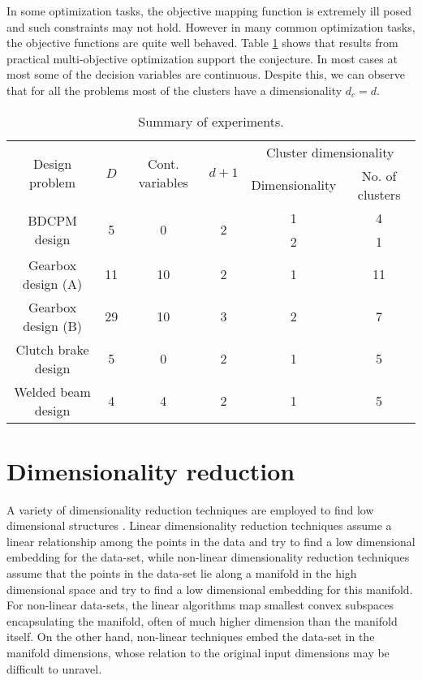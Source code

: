 In some optimization tasks, the objective mapping function is extremely ill
posed and such constraints may not hold. However in many common
optimization tasks, the objective functions are quite well behaved. Table
\ref{expSummary} shows that results from practical multi-objective
optimization support the conjecture. In most cases at most some of the 
decision variables are continuous. Despite this, we can observe that for
all the problems most of the clusters have a dimensionality $d_c = d$.

\begin{table}[!ht]
  \centering
  \begin{tabular}{|c|c|c|c|c|c|}
    \hline
    \multirow{2}{*}{Design problem} & \multirow{2}{*}{$D$} & \multirow{2}{*}{Cont. variables} & \multirow{2}{*}{$d+1$}  & \multicolumn{2}{c|}{Cluster dimensionality} \\
    \cline{5-6} 
    &&&&Dimensionality & No. of clusters \\
    \hline
    \multirow{2}{*}{BDCPM design} & \multirow{2}{*}{5} & \multirow{2}{*}{0} & \multirow{2}{*}{2} & 1 & 4 \\
    \cline{5-6} 
    &&&&2 & 1 \\
    \hline
    Gearbox design (A) & 11 &10 & 2 & 1 & 11 \\
    \hline
    Gearbox design (B) & 29 & 10 & 3 & 2 & 7 \\
    \hline
    Clutch brake design & 5 & 0 & 2 & 1 & 5 \\
    \hline
    Welded beam design & 4 & 4 & 2 & 1 & 5 \\

    \hline
  \end{tabular}
  \caption{Summary of experiments.}
  \label{expSummary}
\end{table}


\section{Dimensionality reduction}
A variety of dimensionality reduction techniques are employed to find low
dimensional structures \citep{mph07}. Linear dimensionality reduction
techniques assume a linear relationship among the points in the data and
try to find a low dimensional embedding for the data-set, while non-linear
dimensionality reduction techniques assume that the points in the data-set
lie along a manifold in the high dimensional space and try to find a low
dimensional embedding for this manifold. For non-linear data-sets, the
linear algorithms map smallest convex subspaces encapsulating the manifold,
often of much higher dimension than the manifold itself. On the other hand,
non-linear techniques embed the data-set in the manifold dimensions, whose
relation to the original input dimensions may be difficult to unravel.

